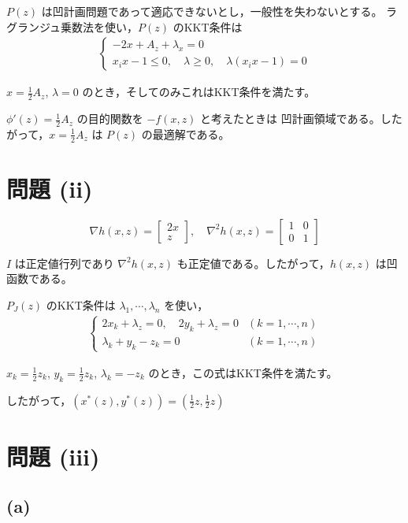 \documentclass[12pt,a4paper]{article}
\begin{document}
$P(z)$ は凹計画問題であって適応できないとし，一般性を失わないとする。
ラグランジュ乗数法を使い，$P(z)$ のKKT条件は
\begin{align}
\begin{cases}
-2x + A_z + \lambda_x = 0 \\
x_i x - 1 \leq 0, \quad \lambda \geq 0, \quad \lambda(x_i x - 1) = 0
\end{cases}
\end{align}

$x = \frac{1}{2}A_z$, $\lambda = 0$ のとき，そしてのみこれはKKT条件を満たす。

$\phi'(z) = \frac{1}{2}A_z$ の目的関数を $-f(x,z)$ と考えたときは
凹計画領域である。したがって，$x = \frac{1}{2}A_z$ は $P(z)$ の最適解である。

\section*{問題 (ii)}

\[\nabla h(x,z) = \begin{bmatrix} 2x \\ z \end{bmatrix}, \quad \nabla^2 h(x,z) = \begin{bmatrix} 1 & 0 \\ 0 & 1 \end{bmatrix}\]

$I$ は正定値行列であり $\nabla^2 h(x,z)$ も正定値である。したがって，$h(x,z)$ は凹函数である。

$P_J(z)$ のKKT条件は $\lambda_1, \cdots, \lambda_n$ を使い，
\begin{align}
\begin{cases}
2x_k + \lambda_z = 0, \quad 2y_k + \lambda_z = 0 & (k = 1, \cdots, n) \\
\lambda_k + y_k - z_k = 0 & (k = 1, \cdots, n)
\end{cases}
\end{align}

$x_k = \frac{1}{2}z_k$, $y_k = \frac{1}{2}z_k$, $\lambda_k = -z_k$ のとき，この式はKKT条件を満たす。

したがって，$(x^*(z), y^*(z)) = (\frac{1}{2}z, \frac{1}{2}z)$

\section*{問題 (iii)}

\subsection*{(a)}
\end{document}
